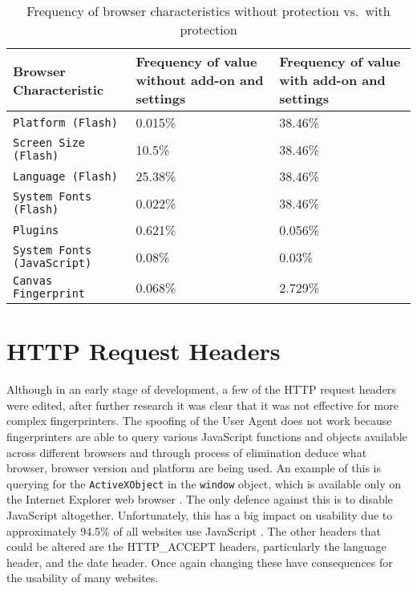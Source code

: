 \begin{table}[h!]
\centering
\begin{tabular}{| p{6cm} | p{4cm} | p{4cm} |}
    \hline
    \textbf{Browser Characteristic} & \textbf{Frequency of value without add-on and settings} & \textbf{Frequency of value with add-on and settings} \\ \hline
    \texttt{Platform (Flash)} & {0.015\%} & {38.46\%} \\ \hline
    \texttt{Screen Size (Flash)} & {10.5\%} & {38.46\%} \\ \hline
    \texttt{Language (Flash)} & {25.38\%} & {38.46\%} \\ \hline
    \texttt{System Fonts (Flash)} & {0.022\%} & {38.46\%} \\ \hline
    \texttt{Plugins} & {0.621\%} & {0.056\%} \\ \hline
    \texttt{System Fonts (JavaScript)} & {0.08\%} & {0.03\%} \\ \hline
    \texttt{Canvas Fingerprint} & {0.068\%} & {2.729\%} \\
    \hline
\end{tabular}
\caption{Frequency of browser characteristics without protection vs.\ with protection}
\label{tab:results}
\end{table}

\section{HTTP Request Headers}

Although in an early stage of development, a few of the HTTP request headers were edited, after further research it was clear that it was not effective for more complex fingerprinters.
The spoofing of the User Agent does not work because fingerprinters are able to query various JavaScript functions and objects available across different browsers and through process of elimination deduce what browser, browser version and platform are being used.
An example of this is querying for the \texttt{ActiveXObject} in the \texttt{window} object, which is available only on the Internet Explorer web browser \citep{activeX}.
The only defence against this is to disable JavaScript altogether.
Unfortunately, this has a big impact on usability due to approximately 94.5\% of all websites use JavaScript \citep{w3-javascript}.
The other headers that could be altered are the HTTP\_ACCEPT headers, particularly the language header, and the date header.
Once again changing these have consequences for the usability of many websites.

